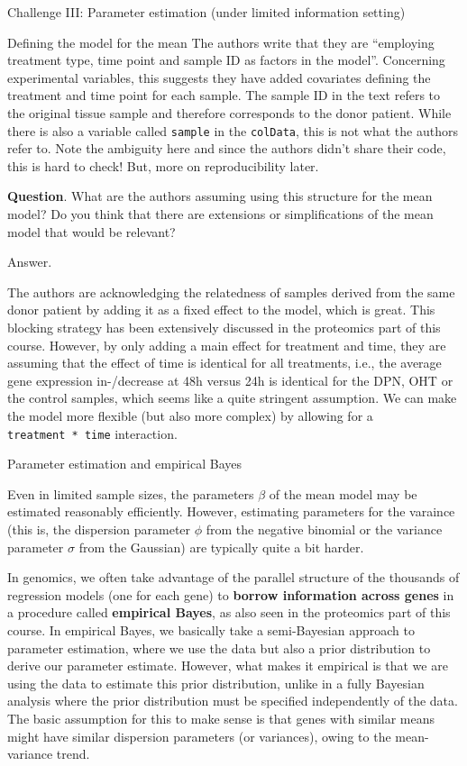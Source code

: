 \documentclass[ignorenonframetext,]{beamer}
\begin{document}
\begin{frame}[fragile]{Challenge III: Parameter estimation (under
limited information setting)}
\begin{block}{Defining the model for the mean}
The authors write that they are ``employing treatment type, time point
and sample ID as factors in the model''. Concerning experimental
variables, this suggests they have added covariates defining the
treatment and time point for each sample. The sample ID in the text
refers to the original tissue sample and therefore corresponds to the
donor patient. While there is also a variable called \texttt{sample} in
the \texttt{colData}, this is not what the authors refer to. Note the
ambiguity here and since the authors didn't share their code, this is
hard to check! But, more on reproducibility later.

\textbf{Question}. What are the authors assuming using this structure
for the mean model? Do you think that there are extensions or
simplifications of the mean model that would be relevant?

 Answer.

The authors are acknowledging the relatedness of samples derived from
the same donor patient by adding it as a fixed effect to the model,
which is great. This blocking strategy has been extensively discussed in
the proteomics part of this course. However, by only adding a main
effect for treatment and time, they are assuming that the effect of time
is identical for all treatments, i.e., the average gene expression
in-/decrease at 48h versus 24h is identical for the DPN, OHT or the
control samples, which seems like a quite stringent assumption. We can
make the model more flexible (but also more complex) by allowing for a
\texttt{treatment\ *\ time} interaction.

\end{block}

\begin{block}{Parameter estimation and empirical Bayes}

Even in limited sample sizes, the parameters \(\beta\) of the mean model
may be estimated reasonably efficiently. However, estimating parameters
for the varaince (this is, the dispersion parameter \(\phi\) from the
negative binomial or the variance parameter \(\sigma\) from the
Gaussian) are typically quite a bit harder.

In genomics, we often take advantage of the parallel structure of the
thousands of regression models (one for each gene) to \textbf{borrow
information across genes} in a procedure called \textbf{empirical
Bayes}, as also seen in the proteomics part of this course. In empirical
Bayes, we basically take a semi-Bayesian approach to parameter
estimation, where we use the data but also a prior distribution to
derive our parameter estimate. However, what makes it empirical is that
we are using the data to estimate this prior distribution, unlike in a
fully Bayesian analysis where the prior distribution must be specified
independently of the data. The basic assumption for this to make sense
is that genes with similar means might have similar dispersion
parameters (or variances), owing to the mean-variance trend.


\end{block}
\end{frame}
\end{document}
